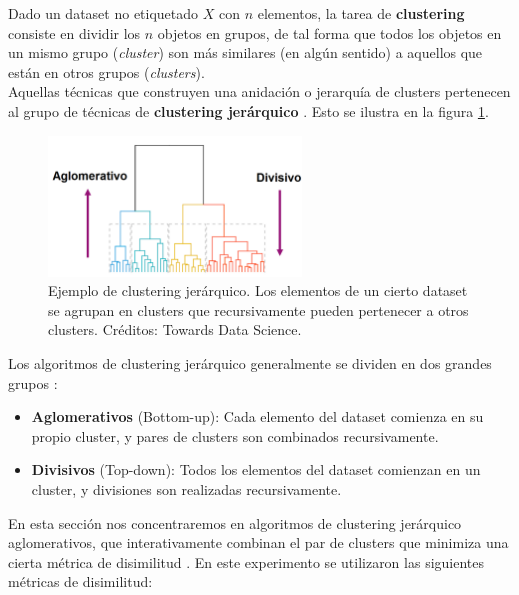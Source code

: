 Dado un dataset no etiquetado $X$ con $n$ elementos, la tarea de \textbf{clustering} \cite{Jain88} consiste en dividir los $n$ objetos en grupos, de tal forma que todos los objetos en un mismo grupo (\textit{cluster}) son más similares (en algún sentido) a aquellos que están en otros grupos (\textit{clusters}). \\

Aquellas técnicas que construyen una anidación o jerarquía de clusters pertenecen al grupo de técnicas de \textbf{clustering jerárquico} \cite{Jain88} \cite{clustering}. Esto se ilustra en la figura \ref{fig:jerarquico}. \\

\begin{figure}[h!]
\begin{center}
 \includegraphics[width=0.6\textwidth]{Kap5/jerarquico.png}
\end{center}

\caption{Ejemplo de clustering jerárquico. Los elementos de un cierto dataset se agrupan en clusters que recursivamente pueden pertenecer a otros clusters. Créditos: Towards Data Science.}
\label{fig:jerarquico}
\end{figure}

Los algoritmos de clustering jerárquico generalmente se dividen en dos grandes grupos \cite{clustering} \cite{iretrieval} :

\begin{itemize}
\item \textbf{Aglomerativos} (Bottom-up): Cada elemento del dataset comienza en su propio cluster, y pares de clusters son combinados recursivamente.
\item \textbf{Divisivos} (Top-down):  Todos los elementos del dataset comienzan en un cluster, y divisiones son realizadas recursivamente.
\end{itemize}

En esta sección nos concentraremos en algoritmos de clustering jerárquico aglomerativos, que interativamente combinan el par de clusters que minimiza una cierta métrica de disimilitud \cite{clustering}. En este experimento se utilizaron las siguientes métricas de disimilitud:

